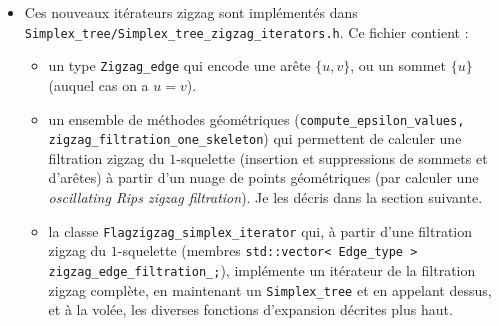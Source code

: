 \documentclass[11pt]{amsart}
\numberwithin{equation}{section}
\theoremstyle{plain}
\theoremstyle{definition}
\newtheorem{remark}[equation]{Remark}
\begin{document}
\begin{itemize}
Dans {\tt Simplex\_tree.h}, cela se traduit par l'introduction d'un type "{\tt Zigzag\_filtration\_simplex\_iterator}" et "{\tt Zigzag\_filtration\_simplex\_range}", et "{\tt Filtration\_simplex\_range}" est choisi en fonction d'un {\tt std::conditional} sur {\tt Options::is\_zigzag} (nouvelle option du simplex tree).

L'interface pour accéder à la filtration est toujours avec 
{\tt filtration\_simplex\_range(...)}, mais dépend désormais d'un {\tt linear\_indexing\_tag} (filtration standard) ou d'un {\tt zigzag\_indexing\_tag}.

\begin{remark}
{\tt linear\_indexing\_tag/zigzag\_indexing\_tag} et {\tt bool is\_zigzag} sont redondants dans les {\tt Options}. Je propose d'utiliser un {\tt constexpr(Options::is\_zigzag)} (que je trouve plus lisible) pour {\tt filtration\_simplex\_range} (et les autres fonctions où {\tt linear\_indexing\_tag} est utilisé), et de supprimer ces {\tt indexing\_tag}. Qu'en pensez-vous ?

Certaines fonctions, comme "{\tt Simplex\_handle simplex(Simplex\_key idx)}", qui n'ont pas de version en persistence zigzag, pourraient utiliser un "{\tt std::false\_type}" en input, auquel cas on appelerait "{\tt simplex(key, Options::is\_zigzag)}". Je pense que ça déclenchera toujours une erreur à la compilation ?
\end{remark}

\item Ces nouveaux itérateurs zigzag sont implémentés dans {\tt Simplex\_tree/Simplex\_tree\_zigzag\_iterators.h}. Ce fichier contient :

\begin{itemize}
\item un type {\tt Zigzag\_edge} qui encode une arête $\{u,v\}$, ou un sommet $\{u\}$ (auquel cas on a $u=v$).
\item un ensemble de méthodes géométriques ({\tt compute\_epsilon\_values, zigzag\_filtration\_one\_skeleton}) qui permettent de calculer une filtration zigzag du $1$-squelette (insertion et suppressions de sommets et d'arêtes) à partir d'un nuage de points géométriques (par calculer une \emph{oscillating Rips zigzag filtration}). Je les décris dans la section suivante.
\item la classe {\tt Flagzigzag\_simplex\_iterator} qui, à partir d'une filtration zigzag du $1$-squelette (membres {\tt std::vector< Edge_type > zigzag\_edge\_filtration\_;}), implémente un itérateur de la filtration zigzag complète, en maintenant un {\tt Simplex\_tree} et en appelant dessus, et à la volée, les diverses fonctions d'expansion décrites plus haut. 


\end{itemize}
\end{itemize}
\end{document}
